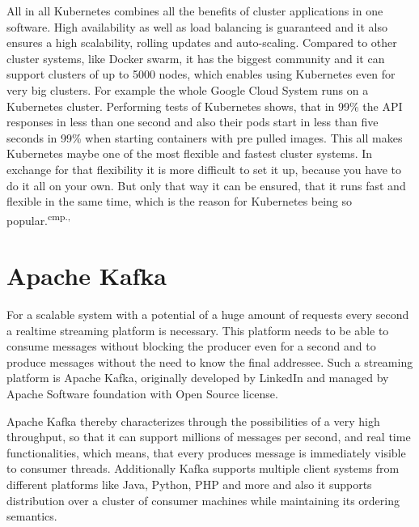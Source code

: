 All in all Kubernetes combines all the benefits of cluster applications in one software. High availability as well as load balancing is guaranteed and it also ensures a high scalability, rolling updates and auto-scaling. Compared to other cluster systems, like Docker swarm, it has the biggest community and it can support clusters of up to 5000 nodes, which enables using Kubernetes even for very big clusters. For example the whole Google Cloud System runs on a Kubernetes cluster. Performing tests of Kubernetes shows, that in 99\% the API responses in less than one second and also their pods start in less than five seconds in 99\% when starting containers with pre pulled images. This all makes Kubernetes maybe one of the most flexible and fastest cluster systems. In exchange for that flexibility it is more difficult to set it up, because you have to do it all on your own. But only that way it can be ensured, that it runs fast and flexible in the same time, which is the reason for Kubernetes being so popular.\textsuperscript{cmp.\cite{19}, \cite{20}}


\section{Apache Kafka}

For a scalable system with a potential of a huge amount of requests every second a realtime streaming platform is necessary. This platform needs to be able to consume messages without blocking the producer even for a second and to produce messages without the need to know the final addressee. Such a streaming platform is Apache Kafka, originally developed by LinkedIn and managed by Apache Software foundation with Open Source license.


Apache Kafka thereby characterizes through the possibilities of a very high throughput, so that it can support millions of messages per second, and real time functionalities, which means, that every produces message is immediately visible to consumer threads. Additionally Kafka supports multiple client systems from different platforms like Java, Python, PHP and more and also it supports distribution over a cluster of consumer machines while maintaining its ordering semantics.

